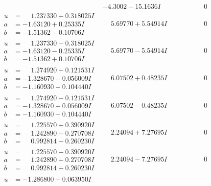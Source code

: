 \documentclass[1p]{elsarticle_modified}
\theoremstyle{definition}
\begin{document}
$$\begin{array}{c|c|c}
 & -4.3002 - 15.1636 I & \phantom{-0.000000 } 0 \\ \hline\begin{aligned}
u &= \phantom{-}1.237330 + 0.318025 I \\
a &= -1.63120 + 0.25335 I \\
b &= -1.51362 - 0.10706 I\end{aligned}
 & \phantom{-}5.69770 + 5.54914 I & \phantom{-0.000000 } 0 \\ \hline\begin{aligned}
u &= \phantom{-}1.237330 - 0.318025 I \\
a &= -1.63120 - 0.25335 I \\
b &= -1.51362 + 0.10706 I\end{aligned}
 & \phantom{-}5.69770 - 5.54914 I & \phantom{-0.000000 } 0 \\ \hline\begin{aligned}
u &= \phantom{-}1.274920 + 0.121531 I \\
a &= -1.328670 + 0.056009 I \\
b &= -1.160930 + 0.104440 I\end{aligned}
 & \phantom{-}6.07502 + 0.48235 I & \phantom{-0.000000 } 0 \\ \hline\begin{aligned}
u &= \phantom{-}1.274920 - 0.121531 I \\
a &= -1.328670 - 0.056009 I \\
b &= -1.160930 - 0.104440 I\end{aligned}
 & \phantom{-}6.07502 - 0.48235 I & \phantom{-0.000000 } 0 \\ \hline\begin{aligned}
u &= \phantom{-}1.225570 + 0.390920 I \\
a &= \phantom{-}1.242890 - 0.270708 I \\
b &= \phantom{-}0.992814 - 0.260230 I\end{aligned}
 & \phantom{-}2.24094 + 7.27695 I & \phantom{-0.000000 } 0 \\ \hline\begin{aligned}
u &= \phantom{-}1.225570 - 0.390920 I \\
a &= \phantom{-}1.242890 + 0.270708 I \\
b &= \phantom{-}0.992814 + 0.260230 I\end{aligned}
 & \phantom{-}2.24094 - 7.27695 I & \phantom{-0.000000 } 0 \\ \hline\begin{aligned}
u &= -1.286800 + 0.063950 I \\

\end{aligned}
\end{array}$$
\end{document}
